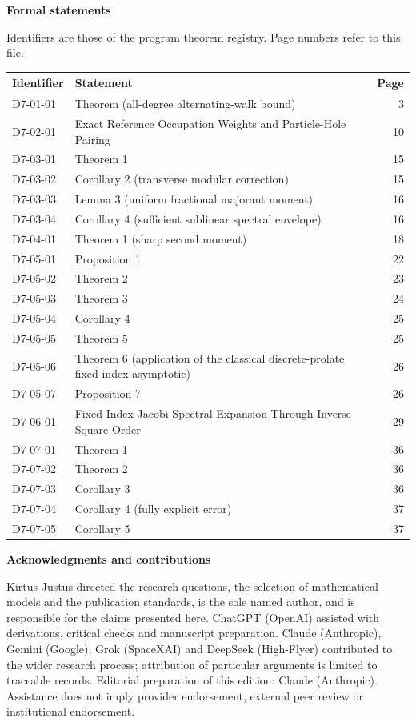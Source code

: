 \documentclass[11pt,a4paper]{article}
\begin{document}
\vspace{2mm}\textbf{Formal statements}\par\vspace{1mm}
{\footnotesize Identifiers are those of the program theorem registry. Page numbers refer to this file.\par}
{\footnotesize\begin{longtable}{@{}l>{\raggedright\arraybackslash}p{}r@{}}
\toprule Identifier & Statement & Page\\\midrule\endhead
D7-01-01 & Theorem (all-degree alternating-walk bound) & 3\\
D7-02-01 & Exact Reference Occupation Weights and Particle-Hole Pairing & 10\\
D7-03-01 & Theorem 1 & 15\\
D7-03-02 & Corollary 2 (transverse modular correction) & 15\\
D7-03-03 & Lemma 3 (uniform fractional majorant moment) & 16\\
D7-03-04 & Corollary 4 (sufficient sublinear spectral envelope) & 16\\
D7-04-01 & Theorem 1 (sharp second moment) & 18\\
D7-05-01 & Proposition 1 & 22\\
D7-05-02 & Theorem 2 & 23\\
D7-05-03 & Theorem 3 & 24\\
D7-05-04 & Corollary 4 & 25\\
D7-05-05 & Theorem 5 & 25\\
D7-05-06 & Theorem 6 (application of the classical discrete-prolate fixed-index asymptotic) & 26\\
D7-05-07 & Proposition 7 & 26\\
D7-06-01 & Fixed-Index Jacobi Spectral Expansion Through Inverse-Square Order & 29\\
D7-07-01 & Theorem 1 & 36\\
D7-07-02 & Theorem 2 & 36\\
D7-07-03 & Corollary 3 & 36\\
D7-07-04 & Corollary 4 (fully explicit error) & 37\\
D7-07-05 & Corollary 5 & 37\\
\bottomrule\end{longtable}}
\vspace{3mm}\textbf{Acknowledgments and contributions}\par
{\small Kirtus Justus directed the research questions, the selection of mathematical models and the publication standards, is the sole named author, and is responsible for the claims presented here. ChatGPT (OpenAI) assisted with derivations, critical checks and manuscript preparation. Claude (Anthropic), Gemini (Google), Grok (SpaceXAI) and DeepSeek (High-Flyer) contributed to the wider research process; attribution of particular arguments is limited to traceable records. Editorial preparation of this edition: Claude (Anthropic). Assistance does not imply provider endorsement, external peer review or institutional endorsement.\par}
\end{document}

